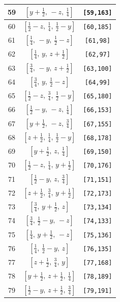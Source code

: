 \documentclass[fleqn,8pt]{jsarticle}
\begin{document}
\begin{longtable}{ccc}
59 & $\left[ y + \frac{1}{2},\, - z,\, \frac{1}{4} \right]$ & {\tt [59,163]} \\ \hline
60 & $\left[ \frac{1}{2} - z,\, \frac{1}{4},\, \frac{1}{2} - y \right]$ & {\tt [60,185]} \\ \hline
61 & $\left[ \frac{1}{4},\, - y,\, \frac{1}{2} - z \right]$ & {\tt [61,98]} \\ \hline
62 & $\left[ \frac{1}{4},\, y,\, z + \frac{1}{2} \right]$ & {\tt [62,97]} \\ \hline
63 & $\left[ \frac{3}{4},\, - y,\, z + \frac{1}{2} \right]$ & {\tt [63,100]} \\ \hline
64 & $\left[ \frac{3}{4},\, y,\, \frac{1}{2} - z \right]$ & {\tt [64,99]} \\ \hline
65 & $\left[ \frac{1}{2} - z,\, \frac{3}{4},\, \frac{1}{2} - y \right]$ & {\tt [65,180]} \\ \hline
66 & $\left[ \frac{1}{2} - y,\, - z,\, \frac{1}{4} \right]$ & {\tt [66,153]} \\ \hline
67 & $\left[ y + \frac{1}{2},\, - z,\, \frac{3}{4} \right]$ & {\tt [67,155]} \\ \hline
68 & $\left[ z + \frac{1}{2},\, \frac{1}{4},\, \frac{1}{2} - y \right]$ & {\tt [68,178]} \\ \hline
69 & $\left[ y + \frac{1}{2},\, z,\, \frac{1}{4} \right]$ & {\tt [69,150]} \\ \hline
70 & $\left[ \frac{1}{2} - z,\, \frac{1}{4},\, y + \frac{1}{2} \right]$ & {\tt [70,176]} \\ \hline
71 & $\left[ \frac{1}{2} - y,\, z,\, \frac{3}{4} \right]$ & {\tt [71,151]} \\ \hline
72 & $\left[ z + \frac{1}{2},\, \frac{3}{4},\, y + \frac{1}{2} \right]$ & {\tt [72,173]} \\ \hline
73 & $\left[ \frac{3}{4},\, y + \frac{1}{2},\, z \right]$ & {\tt [73,134]} \\ \hline
74 & $\left[ \frac{3}{4},\, \frac{1}{2} - y,\, - z \right]$ & {\tt [74,133]} \\ \hline
75 & $\left[ \frac{1}{4},\, y + \frac{1}{2},\, - z \right]$ & {\tt [75,136]} \\ \hline
76 & $\left[ \frac{1}{4},\, \frac{1}{2} - y,\, z \right]$ & {\tt [76,135]} \\ \hline
77 & $\left[ z + \frac{1}{2},\, \frac{3}{4},\, y \right]$ & {\tt [77,168]} \\ \hline
78 & $\left[ y + \frac{1}{2},\, z + \frac{1}{2},\, \frac{1}{4} \right]$ & {\tt [78,189]} \\ \hline
79 & $\left[ \frac{1}{2} - y,\, z + \frac{1}{2},\, \frac{3}{4} \right]$ & {\tt [79,191]} \\ \hline

\end{longtable}
\end{document}
